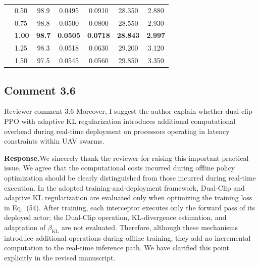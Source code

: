 \documentclass[11pt]{article}
\newcommand{\rsp}{\medskip\noindent\textbf{Response.}\quad}
\begin{document}
\begin{tcolorbox}[enhanced,breakable,colback=white,colframe=addblue!55,
coltext=addblue,fontupper=\color{addblue},boxrule=0.6pt,arc=2pt,
left=9pt,right=9pt,top=7pt,bottom=7pt]
{{\begin{tabular}{@{}llccccc@{}}
& 0.50          & 98.9          & 0.0495          & 0.0910          & 28.350          & 2.880 \\
& 0.75          & 98.8          & 0.0500          & 0.0800          & 28.550          & 2.930 \\
& \textbf{1.00} & \textbf{98.7} & \textbf{0.0505} & \textbf{0.0718} & \textbf{28.843} & \textbf{2.997} \\
& 1.25          & 98.3          & 0.0518          & 0.0630          & 29.200          & 3.120 \\
& 1.50          & 97.5          & 0.0545          & 0.0560          & 29.850          & 3.350 \\
\bottomrule
\end{tabular}
}
\par}
\end{tcolorbox}




\subsection*{Comment 3.6}
\begin{reviewercomment}{Reviewer comment 3.6}
Moreover, I suggest the author explain whether dual-clip PPO with adaptive
KL regularization introduces additional computational overhead during
real-time deployment on processors operating in latency constraints within
UAV swarms.
\end{reviewercomment}

\rsp We sincerely thank the reviewer for raising this important practical
issue. We agree that the computational costs incurred during offline policy
optimization should be clearly distinguished from those incurred during
real-time execution. In the adopted training-and-deployment framework,
Dual-Clip and adaptive KL regularization are evaluated only when optimizing
the training loss in Eq.~(54). After training, each interceptor executes only
the forward pass of its deployed actor; the Dual-Clip operation, KL-divergence
estimation, and adaptation of $\beta_{\mathrm{KL}}$ are not evaluated.
Therefore, although these mechanisms introduce additional operations during
offline training, they add no incremental computation to the real-time
inference path. We have clarified this point explicitly in the revised
manuscript.
\end{document}
